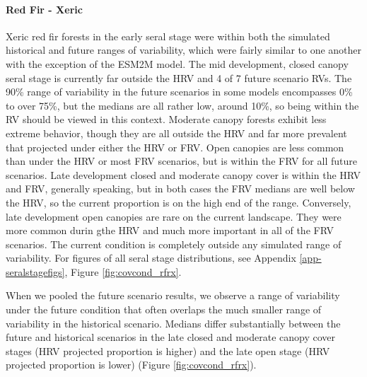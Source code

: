 \paragraph{Red Fir - Xeric} Xeric red fir forests in the early seral stage were within both the simulated historical and future ranges of variability, which were fairly similar to one another with the exception of the ESM2M model. The mid development, closed canopy seral stage is currently far outside the HRV and 4 of 7 future scenario RVs. The 90\% range of variability in the future scenarios in some models encompasses 0\% to over 75\%, but the medians are all rather low, around 10\%, so being within the RV should be viewed in this context. Moderate canopy forests exhibit less extreme behavior, though they are all outside the HRV and far more prevalent that projected under either the HRV or FRV. Open canopies are less common than under the HRV or most FRV scenarios, but is within the FRV for all future scenarios. Late development closed and moderate canopy cover is within the HRV and FRV, generally speaking, but in both cases the FRV medians are well below the HRV, so the current proportion is on the high end of the range. Conversely, late development open canopies are rare on the current landscape. They were more common durin gthe HRV and much more important in all of the FRV scenarios. The current condition is completely outside any simulated range of variability. For figures of all seral stage distributions, see Appendix \ref{app-seralstagefigs}, Figure \ref{fig:covcond_rfrx}.

When we pooled the future scenario results, we observe a range of variability under the future condition that often overlaps the much smaller range of variability in the historical scenario. Medians differ substantially between the future and historical scenarios in the late closed and moderate canopy cover stages (HRV projected proportion is higher) and the late open stage (HRV projected proportion is lower) (Figure \ref{fig:covcond_rfrx}).

